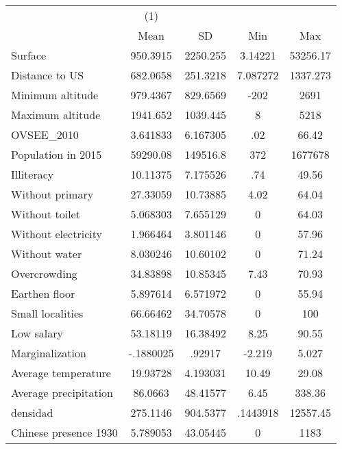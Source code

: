 {
\def\sym#1{\ifmmode^{#1}\else\(^{#1}\)\fi}
\begin{tabular}{l*{1}{cccc}}
\hline\hline
                    &\multicolumn{1}{c}{(1)}&            &            &            \\
                    &        Mean&          SD&         Min&         Max\\
\hline
Surface             &    950.3915&    2250.255&     3.14221&    53256.17\\
Distance to US      &    682.0658&    251.3218&    7.087272&    1337.273\\
Minimum altitude    &    979.4367&    829.6569&        -202&        2691\\
Maximum altitude    &    1941.652&    1039.445&           8&        5218\\
OVSEE\_2010          &    3.641833&    6.167305&         .02&       66.42\\
Population in 2015  &    59290.08&    149516.8&         372&     1677678\\
Illiteracy          &    10.11375&    7.175526&         .74&       49.56\\
Without primary     &    27.33059&    10.73885&        4.02&       64.04\\
Without toilet      &    5.068303&    7.655129&           0&       64.03\\
Without electricity &    1.966464&    3.801146&           0&       57.96\\
Without water       &    8.030246&    10.60102&           0&       71.24\\
Overcrowding        &    34.83898&    10.85345&        7.43&       70.93\\
Earthen floor       &    5.897614&    6.571972&           0&       55.94\\
Small localities    &    66.66462&    34.70578&           0&         100\\
Low salary          &    53.18119&    16.38492&        8.25&       90.55\\
Marginalization     &   -.1880025&      .92917&      -2.219&       5.027\\
Average temperature &    19.93728&    4.193031&       10.49&       29.08\\
Average precipitation&     86.0663&    48.41577&        6.45&      338.36\\
densidad            &    275.1146&    904.5377&    .1443918&    12557.45\\
Chinese presence 1930&    5.789053&    43.05445&           0&        1183\\

\end{tabular}}
